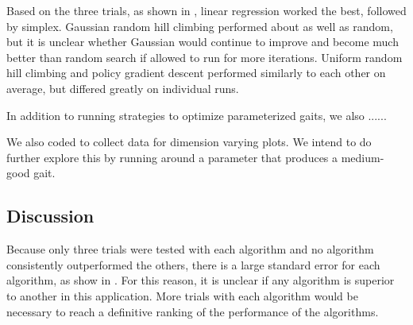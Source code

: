 Based on the three trials, as shown in , linear
regression worked the best, followed by simplex. Gaussian random hill
climbing performed about as well as random, but it is unclear whether
Gaussian would continue to improve and become much better than random
search if allowed to run for more iterations. Uniform random hill
climbing and policy gradient descent performed similarly to each other
on average, but differed greatly on individual runs.



In addition to running strategies to optimize parameterized gaits, we
also ......

We also coded  to collect data for dimension
varying plots. We intend to do further explore this by running
 around a parameter that produces a medium-good gait.










\subsection{Discussion}

Because only three trials were tested with each algorithm and no
algorithm consistently outperformed the others, there is a large
standard error for each algorithm, as show in . For
this reason, it is unclear if any algorithm is superior to another in
this application. More trials with each algorithm would be necessary
to reach a definitive ranking of the performance of the algorithms.

